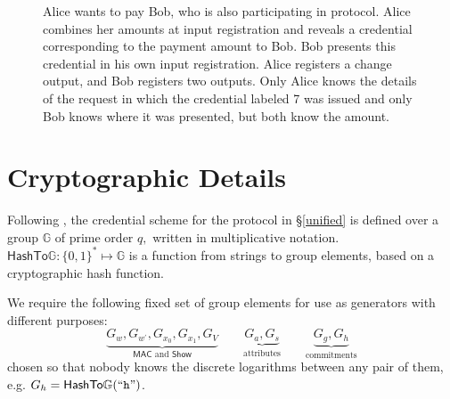 \documentclass{article}
\begin{document}
\begin{figure}[h!]
  \centering
  \caption{Alice wants to pay Bob, who is also participating in protocol. Alice combines her amounts at input registration and reveals a credential corresponding to the payment amount to Bob. Bob presents this credential in his own input registration. Alice registers a change output, and Bob registers two outputs. Only Alice knows the details of the request in which the credential labeled 7 was issued and only Bob knows where it was presented, but both know the amount.}
  \label{fig:ex4}
\end{figure}

\section{Cryptographic Details}\label{details}

Following \cite{chase2019signal}, the credential scheme for the protocol in \S\ref{unified} is defined over a group \(\mathbb{G}\) of prime order \(q,\) written in multiplicative notation.
$\mathsf{HashTo\mathbb{G}} : \{0,1\}^{*} \mapsto \mathbb{G}$ is a function from strings to group elements, based on a cryptographic hash function\cite{fouque2012indifferentiable}.

We require the following fixed set of group elements for use as generators with different purposes:
\[
\underbrace{G_{w}, G_{w^{\prime}}, G_{x_{0}}, G_{x_{1}}, G_{V}}_{\mathsf{MAC} \text{~and~} \mathsf{Show}}
\qquad
\underbrace{G_{a}, G_{s}}_{\text{attributes}}
\qquad
\underbrace{G_g, G_h}_{\text{commitments}}
\]
chosen so that nobody knows the discrete logarithms between any pair of them, e.g. $G_h = \mathsf{HashTo\mathbb{G}}(``\texttt{h}")$.
\end{document}
